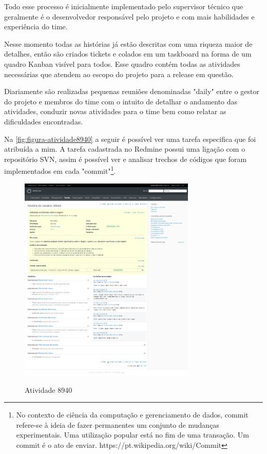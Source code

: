 Todo esse processo é inicialmente implementado pelo supervisor técnico que geralmente é o desenvolvedor responsável pelo projeto e com mais habilidades e experiência do time.

Nesse momento todas as histórias já estão descritas com uma riqueza maior de detalhes, então são criados tickets e colados em um taskboard na forma de um quadro Kanban visível para todos. Esse quadro contém todas as atividades necessárias que atendem ao escopo do projeto para a release em questão. 

Diariamente são realizadas pequenas reuniões denominadas "daily" entre o gestor do projeto e membros do time com o intuito de detalhar o andamento das atividades, conduzir novas atividades para o time bem como relatar as dificuldades encontradas.

Na \autoref{fig:figura-atividade8940} a seguir é possível ver uma tarefa especifica que foi atribuída a mim. A tarefa cadastrada no Redmine possui uma ligação com o repositório SVN, assim é possível ver e analisar trechos de códigos que foram implementados em cada "commit"\footnote{No contexto de ciência da computação e gerenciamento de dados, commit refere-se à ideia de fazer permanentes um conjunto de mudanças experimentais. Uma utilização popular está no fim de uma transação. Um commit é o ato de enviar. https://pt.wikipedia.org/wiki/Commit}.

\begin{figure}[!htb]
    \centering
    \caption{Atividade 8940}
    \includegraphics[width=0.75\textwidth]{dados/figuras/veiculos-atividade1.png}
    \label{fig:figura-atividade8940}
\end{figure}

